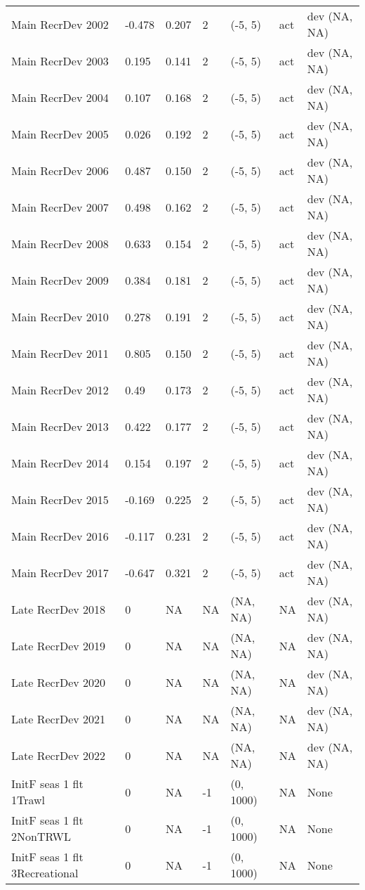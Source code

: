 \documentclass[11pt,
  english,
  letterpaper,
]{article}
\begin{document}
\begin{landscape}
\begin{longtable}[t]{>{\raggedright\arraybackslash}p{7.5cm}lllll>{\raggedright\arraybackslash}p{3.5cm}}
Main RecrDev 2002 & -0.478 & 0.207 & 2 & (-5, 5) & act & dev (NA, NA)\\
Main RecrDev 2003 & 0.195 & 0.141 & 2 & (-5, 5) & act & dev (NA, NA)\\
Main RecrDev 2004 & 0.107 & 0.168 & 2 & (-5, 5) & act & dev (NA, NA)\\
Main RecrDev 2005 & 0.026 & 0.192 & 2 & (-5, 5) & act & dev (NA, NA)\\
Main RecrDev 2006 & 0.487 & 0.150 & 2 & (-5, 5) & act & dev (NA, NA)\\
Main RecrDev 2007 & 0.498 & 0.162 & 2 & (-5, 5) & act & dev (NA, NA)\\
Main RecrDev 2008 & 0.633 & 0.154 & 2 & (-5, 5) & act & dev (NA, NA)\\
Main RecrDev 2009 & 0.384 & 0.181 & 2 & (-5, 5) & act & dev (NA, NA)\\
Main RecrDev 2010 & 0.278 & 0.191 & 2 & (-5, 5) & act & dev (NA, NA)\\
Main RecrDev 2011 & 0.805 & 0.150 & 2 & (-5, 5) & act & dev (NA, NA)\\
Main RecrDev 2012 & 0.49 & 0.173 & 2 & (-5, 5) & act & dev (NA, NA)\\
Main RecrDev 2013 & 0.422 & 0.177 & 2 & (-5, 5) & act & dev (NA, NA)\\
Main RecrDev 2014 & 0.154 & 0.197 & 2 & (-5, 5) & act & dev (NA, NA)\\
Main RecrDev 2015 & -0.169 & 0.225 & 2 & (-5, 5) & act & dev (NA, NA)\\
Main RecrDev 2016 & -0.117 & 0.231 & 2 & (-5, 5) & act & dev (NA, NA)\\
Main RecrDev 2017 & -0.647 & 0.321 & 2 & (-5, 5) & act & dev (NA, NA)\\
Late RecrDev 2018 & 0 & NA & NA & (NA, NA) & NA & dev (NA, NA)\\
Late RecrDev 2019 & 0 & NA & NA & (NA, NA) & NA & dev (NA, NA)\\
Late RecrDev 2020 & 0 & NA & NA & (NA, NA) & NA & dev (NA, NA)\\
Late RecrDev 2021 & 0 & NA & NA & (NA, NA) & NA & dev (NA, NA)\\
Late RecrDev 2022 & 0 & NA & NA & (NA, NA) & NA & dev (NA, NA)\\
InitF seas 1 flt 1Trawl & 0 & NA & -1 & (0, 1000) & NA & None\\
InitF seas 1 flt 2NonTRWL & 0 & NA & -1 & (0, 1000) & NA & None\\
InitF seas 1 flt 3Recreational & 0 & NA & -1 & (0, 1000) & NA & None\\

\end{longtable}
\end{landscape}
\end{document}
